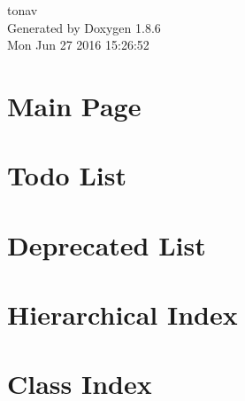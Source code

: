 \documentclass[twoside]{book}
\newcommand{\clearemptydoublepage}{%
  \newpage{\pagestyle{empty}\cleardoublepage}%
}
\begin{document}
\hypersetup{pageanchor=false}
\begin{titlepage}
\vspace*{7cm}
\begin{center}%
{\Large tonav }\\
\vspace*{1cm}
{\large Generated by Doxygen 1.8.6}\\
\vspace*{0.5cm}
{\small Mon Jun 27 2016 15:26:52}\\
\end{center}
\end{titlepage}
\clearemptydoublepage
\tableofcontents
\clearemptydoublepage
{}
\hypersetup{pageanchor=true}

\chapter{Main Page}
\label{index}\hypertarget{index}{}
\chapter{Todo List}
\label{todo}
\hypertarget{todo}{}

\chapter{Deprecated List}
\label{deprecated}
\hypertarget{deprecated}{}

\chapter{Hierarchical Index}

\chapter{Class Index}

\end{document}

